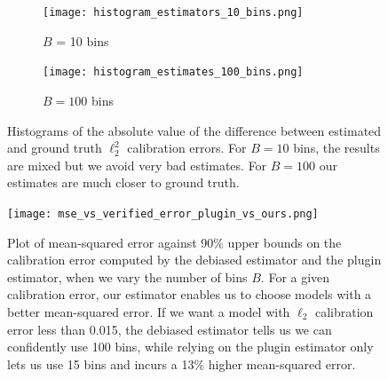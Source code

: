 \begin{figure}
  \centering
  \centering
     \begin{subfigure}[b]{0.45\textwidth}
         \centering
         \texttt{[image: histogram\_estimators\_10\_bins.png]}
         \caption{$B$ = 10 bins}
     \end{subfigure}
     \hfill
     \begin{subfigure}[b]{0.45\textwidth}
         \centering
         \texttt{[image: histogram\_estimates\_100\_bins.png]}
         \caption{$B = 100$ bins}
     \end{subfigure}
  \caption{Histograms of the absolute value of the difference between estimated and ground truth $\ell_2^2$ calibration errors. For $B = 10$ bins, the results are mixed but we avoid very bad estimates. For $B=100$ our estimates are much closer to ground truth.}
  \label{fig:histograms_estimators_bins}
\end{figure}

\begin{figure}
  \centering
  \texttt{[image: mse\_vs\_verified\_error\_plugin\_vs\_ours.png]}
  \caption{Plot of mean-squared error against 90\% upper bounds on the calibration error computed by the debiased estimator and the plugin estimator, when we vary the number of bins $B$. For a given calibration error, our estimator enables us to choose models with a better mean-squared error. If we want a model with $\ell_2$ calibration error less than 0.015, the debiased estimator tells us we can confidently use 100 bins, while relying on the plugin estimator only lets us use 15 bins and incurs a 13\% higher mean-squared error.}
  \label{fig:mse_vs_ce_estimator}
\end{figure}

